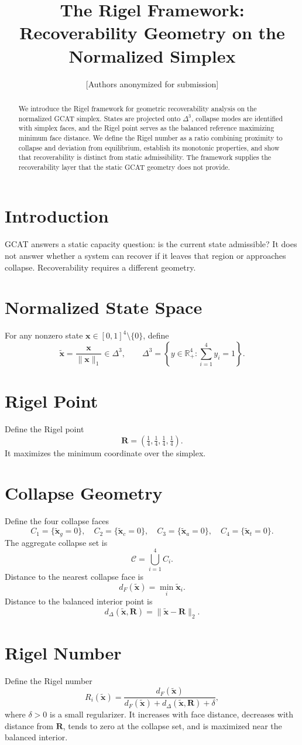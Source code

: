 \documentclass[letterpaper,10pt,conference]{ieeeconf}
\title{\bf The Rigel Framework: Recoverability Geometry on the Normalized Simplex}
\author{[Authors anonymized for submission]}
\newcommand{\x}{\mathbf{x}}
\newcommand{\xt}{\tilde{\mathbf{x}}}
\newcommand{\Cset}{\mathcal{C}}
\newcommand{\Ri}{R_i}
\newcommand{\Rigel}{\mathbf{R}}
\begin{document}
\maketitle
\thispagestyle{empty}
\pagestyle{empty}
\begin{abstract}
We introduce the Rigel framework for geometric recoverability analysis on the normalized GCAT simplex. States are projected onto $\Delta^3$, collapse modes are identified with simplex faces, and the Rigel point serves as the balanced reference maximizing minimum face distance. We define the Rigel number as a ratio combining proximity to collapse and deviation from equilibrium, establish its monotonic properties, and show that recoverability is distinct from static admissibility. The framework supplies the recoverability layer that the static GCAT geometry does not provide.
\end{abstract}
\section{Introduction}
GCAT answers a static capacity question: is the current state admissible? It does not answer whether a system can recover if it leaves that region or approaches collapse. Recoverability requires a different geometry.
\section{Normalized State Space}
For any nonzero state $\x\in[0,1]^4\setminus\{0\}$, define
\[
\xt=\frac{\x}{\|\x\|_1}\in\Delta^3,\qquad
\Delta^3=\left\{y\in\mathbb{R}^4_+:\sum_{i=1}^4 y_i=1\right\}.
\]
\section{Rigel Point}
Define the Rigel point
\[
\Rigel=\left(\tfrac14,\tfrac14,\tfrac14,\tfrac14\right).
\]
It maximizes the minimum coordinate over the simplex.
\section{Collapse Geometry}
Define the four collapse faces
\[
C_1=\{\xt_g=0\},\quad
C_2=\{\xt_c=0\},\quad
C_3=\{\xt_a=0\},\quad
C_4=\{\xt_t=0\}.
\]
The aggregate collapse set is
\[
\Cset=\bigcup_{i=1}^4 C_i.
\]
Distance to the nearest collapse face is
\[
d_F(\xt)=\min_i \xt_i.
\]
Distance to the balanced interior point is
\[
d_\Delta(\xt,\Rigel)=\|\xt-\Rigel\|_2.
\]
\section{Rigel Number}
Define the Rigel number
\[
\Ri(\xt)=\frac{d_F(\xt)}{d_F(\xt)+d_\Delta(\xt,\Rigel)+\delta},
\]
where $\delta>0$ is a small regularizer.
It increases with face distance, decreases with distance from $\Rigel$, tends to zero at the collapse set, and is maximized near the balanced interior.
\end{document}
